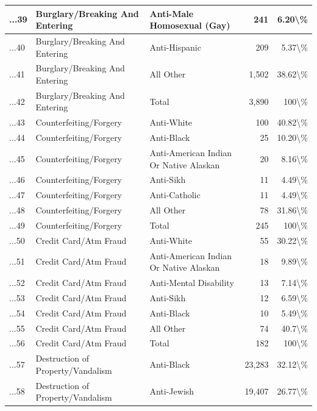 \documentclass[
]{krantz}
\begin{document}
\begin{longtable}[t]{l|l|l|r|r}
\hline
...39 & Burglary/Breaking And Entering & Anti-Male Homosexual (Gay) & 241 & 6.20\textbackslash{}\%\\
\hline
...40 & Burglary/Breaking And Entering & Anti-Hispanic & 209 & 5.37\textbackslash{}\%\\
\hline
...41 & Burglary/Breaking And Entering & All Other & 1,502 & 38.62\textbackslash{}\%\\
\hline
...42 & Burglary/Breaking And Entering & Total & 3,890 & 100\textbackslash{}\%\\
\hline
...43 & Counterfeiting/Forgery & Anti-White & 100 & 40.82\textbackslash{}\%\\
\hline
...44 & Counterfeiting/Forgery & Anti-Black & 25 & 10.20\textbackslash{}\%\\
\hline
...45 & Counterfeiting/Forgery & Anti-American Indian Or Native Alaskan & 20 & 8.16\textbackslash{}\%\\
\hline
...46 & Counterfeiting/Forgery & Anti-Sikh & 11 & 4.49\textbackslash{}\%\\
\hline
...47 & Counterfeiting/Forgery & Anti-Catholic & 11 & 4.49\textbackslash{}\%\\
\hline
...48 & Counterfeiting/Forgery & All Other & 78 & 31.86\textbackslash{}\%\\
\hline
...49 & Counterfeiting/Forgery & Total & 245 & 100\textbackslash{}\%\\
\hline
...50 & Credit Card/Atm Fraud & Anti-White & 55 & 30.22\textbackslash{}\%\\
\hline
...51 & Credit Card/Atm Fraud & Anti-American Indian Or Native Alaskan & 18 & 9.89\textbackslash{}\%\\
\hline
...52 & Credit Card/Atm Fraud & Anti-Mental Disability & 13 & 7.14\textbackslash{}\%\\
\hline
...53 & Credit Card/Atm Fraud & Anti-Sikh & 12 & 6.59\textbackslash{}\%\\
\hline
...54 & Credit Card/Atm Fraud & Anti-Black & 10 & 5.49\textbackslash{}\%\\
\hline
...55 & Credit Card/Atm Fraud & All Other & 74 & 40.7\textbackslash{}\%\\
\hline
...56 & Credit Card/Atm Fraud & Total & 182 & 100\textbackslash{}\%\\
\hline
...57 & Destruction of Property/Vandalism & Anti-Black & 23,283 & 32.12\textbackslash{}\%\\
\hline
...58 & Destruction of Property/Vandalism & Anti-Jewish & 19,407 & 26.77\textbackslash{}\%\\

\end{longtable}
\end{document}
